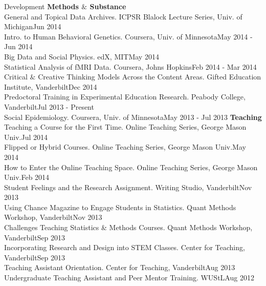 \documentclass {resume}
\begin{document}
\begin{rSection}{\textrm{Development}}
{\large \textbf{Methods $\&$ Substance}}\\
General and Topical Data Archives. ICPSR Blalock Lecture Series, Univ. of Michigan\hfill  {Jun 2014}\smallskip\\
Intro. to Human Behavioral Genetics. Coursera, Univ. of Minnesota\hfill  {May 2014 - Jun 2014}\smallskip\\
Big Data and Social Physics. edX, MIT\hfill  {May 2014}\smallskip\\
Statistical Analysis of fMRI Data. Coursera, Johns Hopkins\hfill  {Feb 2014 - Mar 2014}\smallskip\\
Critical $\&$ Creative Thinking Models Across the Content Areas. Gifted Education Institute, Vanderbilt\hfill {Dec 2014}\smallskip\\
Predoctoral Training in Experimental Education Research. Peabody College, Vanderbilt\hfill  {Jul 2013 - Present}\smallskip\\
Social Epidemiology. Coursera, Univ. of Minnesota\hfill  {May 2013 - Jul 2013}\newpage%
{\large {\bf Teaching}}\\
Teaching a Course for the First Time. Online Teaching Series, George Mason Univ.\hfill  {Jul 2014}\smallskip\\
Flipped or Hybrid Courses. Online Teaching Series, George Mason Univ.\hfill  {May 2014}\smallskip\\
How to Enter the Online Teaching Space. Online Teaching Series, George Mason Univ.\hfill  {Feb 2014}\smallskip\\
Student Feelings and the Research Assignment. Writing Studio, Vanderbilt\hfill  {Nov 2013}\smallskip\\
Using Chance Magazine to Engage Students in Statistics. Quant Methods Workshop, Vanderbilt\hfill  {Nov 2013}\smallskip\\
Challenges Teaching Statistics \& Methods Courses. Quant Methods Workshop, Vanderbilt\hfill  {Sep 2013}\smallskip\\
Incorporating Research and Design into STEM Classes. Center for Teaching, Vanderbilt\hfill  {Sep 2013}\smallskip\\
Teaching Assistant Orientation. Center for Teaching, Vanderbilt\hfill  {Aug 2013}\smallskip\\
Undergraduate Teaching Assistant and Peer Mentor Training. WUStL\hfill  {Aug 2012}
\end{rSection}
\end{document}
